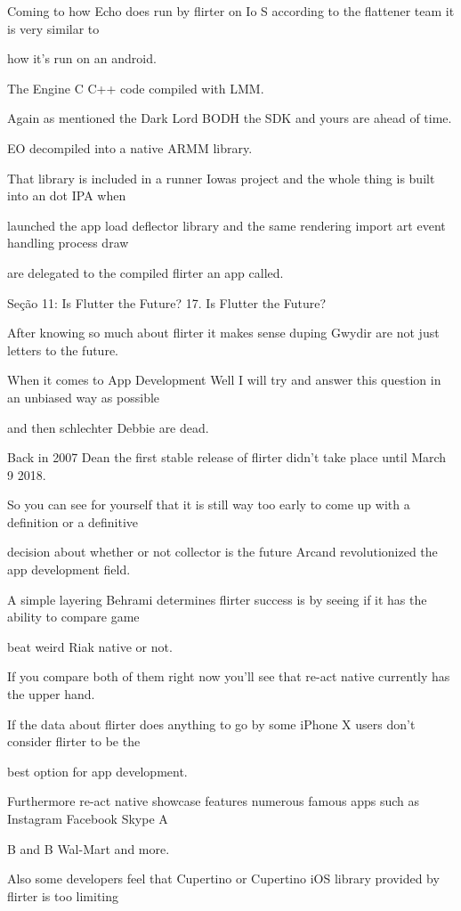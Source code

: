 Coming to how Echo does run by flirter on Io S according to the flattener team it is very similar to

how it's run on an android.

The Engine C C++ code compiled with LMM.

Again as mentioned the Dark Lord BODH the SDK and yours are ahead of time.

EO decompiled into a native ARMM library.

That library is included in a runner Iowas project and the whole thing is built into an dot IPA when

launched the app load deflector library and the same rendering import art event handling process draw

are delegated to the compiled flirter an app called.


Seção 11: Is Flutter the Future?
17. Is Flutter the Future?

After knowing so much about flirter it makes sense duping Gwydir are not just letters to the future.

When it comes to App Development Well I will try and answer this question in an unbiased way as possible

and then schlechter Debbie are dead.

Back in 2007 Dean the first stable release of flirter didn't take place until March 9 2018.

So you can see for yourself that it is still way too early to come up with a definition or a definitive

decision about whether or not collector is the future Arcand revolutionized the app development field.

A simple layering Behrami determines flirter success is by seeing if it has the ability to compare game

beat weird Riak native or not.

If you compare both of them right now you'll see that re-act native currently has the upper hand.

If the data about flirter does anything to go by some iPhone X users don't consider flirter to be the

best option for app development.

Furthermore re-act native showcase features numerous famous apps such as Instagram Facebook Skype A

B and B Wal-Mart and more.

Also some developers feel that Cupertino or Cupertino iOS library provided by flirter is too limiting

